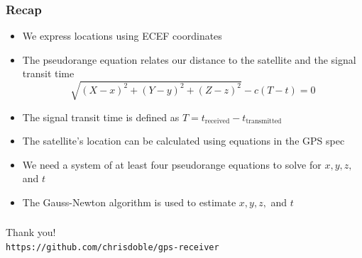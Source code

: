 \documentclass[aspectratio=169, xcolor=table]{beamer}
\begin{document}
\begin{frame}
  \frametitle{Recap}

  \begin{itemize}
    \item<2-> We express locations using ECEF coordinates

    \item<3-> The pseudorange equation relates our distance to the satellite and the signal transit time \[\sqrt{(X - x)^2 + (Y - y)^2 + (Z - z)^2} - c (T - t) = 0\]
    
    \item<4-> The signal transit time is defined as $T = t_\text{received} - t_\text{transmitted}$
    
    \item<5-> The satellite's location can be calculated using equations in the GPS spec
    
    \item<6-> We need a system of at least four pseudorange equations to solve for $x, y, z,$ and $t$
    
    \item<7-> The Gauss-Newton algorithm is used to estimate $x, y, z,$ and $t$
  \end{itemize}
\end{frame}

\begin{frame}
  \frametitle{}

  \centering
  \vspace{1cm}
  {\Huge Thank you!} \\
  \vspace{1cm}
  \texttt{https://github.com/chrisdoble/gps-receiver}
\end{frame}
\end{document}

